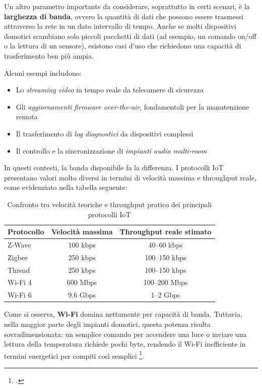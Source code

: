 Un altro parametro importante da considerare, soprattutto in certi scenari, è la \textbf{larghezza di banda}, ovvero la quantità di dati che possono essere trasmessi attraverso la rete in un dato intervallo di tempo. Anche se molti dispositivi domotici scambiano solo piccoli pacchetti di dati (ad esempio, un comando on/off o la lettura di un sensore), esistono casi d’uso che richiedono una capacità di trasferimento ben più ampia.

Alcuni esempi includono:

\begin{itemize}
    \item Lo \textit{streaming video} in tempo reale da telecamere di sicurezza
    \item Gli \textit{aggiornamenti firmware over-the-air}, fondamentali per la manutenzione remota
    \item Il trasferimento di \textit{log diagnostici} da dispositivi complessi
    \item Il controllo e la sincronizzazione di \textit{impianti audio multi-room}
\end{itemize}

In questi contesti, la banda disponibile fa la differenza. I protocolli IoT presentano valori molto diversi in termini di velocità massima e throughput reale, come evidenziato nella tabella seguente:

\begin{table}[h]
\centering
\begin{tabular}{|l|c|c|}
\hline
\textbf{Protocollo} & \textbf{Velocità massima} & \textbf{Throughput reale stimato} \\
\hline
Z-Wave & 100 kbps & 40–60 kbps \\
Zigbee & 250 kbps & 100–150 kbps \\
Thread & 250 kbps & 100–150 kbps \\
Wi-Fi 4 & 600 Mbps & 100–200 Mbps \\
Wi-Fi 6 & 9.6 Gbps & 1–2 Gbps \\
\hline
\end{tabular}
\caption{Confronto tra velocità teoriche e throughput pratico dei principali protocolli IoT}
\end{table}

Come si osserva, \textbf{Wi-Fi} domina nettamente per capacità di banda. Tuttavia, nella maggior parte degli impianti domotici, questa potenza risulta sovradimensionata: un semplice comando per accendere una luce o inviare una lettura della temperatura richiede pochi byte, rendendo il Wi-Fi inefficiente in termini energetici per compiti così semplici \footcite{wifi6-spec}. 

